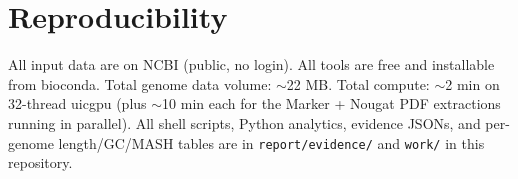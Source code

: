 \documentclass[11pt]{article}
\begin{document}
\section{Reproducibility}

All input data are on NCBI (public, no login). All tools are free and installable from bioconda. Total genome data volume: $\sim$22 MB. Total compute: $\sim$2 min on 32-thread uicgpu (plus $\sim$10 min each for the Marker + Nougat PDF extractions running in parallel). All shell scripts, Python analytics, evidence JSONs, and per-genome length/GC/MASH tables are in \texttt{report/evidence/} and \texttt{work/} in this repository.
\end{document}
